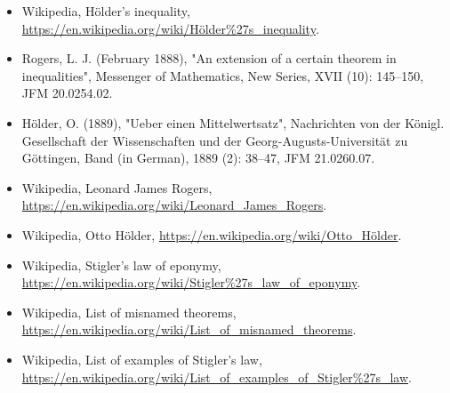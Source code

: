 \begin{itemize}
    \item Wikipedia, Hölder's inequality, \url{https://en.wikipedia.org/wiki/Hölder%27s_inequality}.
    \item Rogers, L. J. (February 1888), "An extension of a certain theorem in inequalities", Messenger of Mathematics, New Series, XVII (10): 145–150, JFM 20.0254.02.
    \item Hölder, O. (1889), "Ueber einen Mittelwertsatz", Nachrichten von der Königl. Gesellschaft der Wissenschaften und der Georg-Augusts-Universität zu Göttingen, Band (in German), 1889 (2): 38–47, JFM 21.0260.07.
    \item Wikipedia, Leonard James Rogers, \url{https://en.wikipedia.org/wiki/Leonard_James_Rogers}.
    \item Wikipedia, Otto Hölder, \url{https://en.wikipedia.org/wiki/Otto_Hölder}.
    \item Wikipedia, Stigler's law of eponymy, \url{https://en.wikipedia.org/wiki/Stigler%27s_law_of_eponymy}.
    \item Wikipedia, List of misnamed theorems, \url{https://en.wikipedia.org/wiki/List_of_misnamed_theorems}.
    \item Wikipedia, List of examples of Stigler's law, \url{https://en.wikipedia.org/wiki/List_of_examples_of_Stigler%27s_law}.
\end{itemize}


